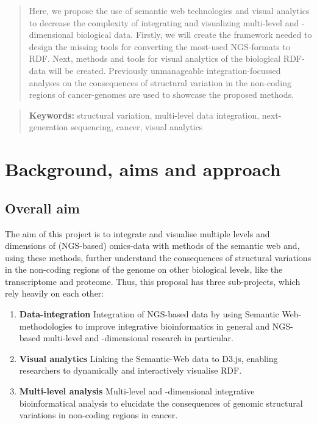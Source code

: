 \documentclass[twoside,fontsize=10pt]{article}
\renewcommand{\abstractname}{}    %
\begin{document}
\begin{abstract}
\noindent Here, we propose the use of semantic web technologies and visual analytics to decrease the complexity of integrating and visualizing multi-level and -dimensional biological data. Firstly, we will create the framework needed to design the missing tools for converting the most-used NGS-formats to RDF. Next, methods and tools for visual analytics of the biological RDF-data will be created. Previously unmanageable integration-focussed analyses on the consequences of structural variation in the non-coding regions of cancer-genomes are used to showcase the proposed methods.
\end{abstract}
\medskip
\renewcommand{\abstractname}{\begin{center}
Layman's summary
\end{center}}    %
\begin{abstract}\noindent 
\lipsum[1]
\medskip
\noindent \textbf{Keywords:} structural variation, multi-level data integration, next-generation sequencing, cancer, visual analytics
\end{abstract}



\newpage
\section*{Background, aims and approach}
\subsection*{Overall aim}
The aim of this project is to integrate and visualise multiple levels and dimensions of (NGS-based) omics-data with methods of the semantic web and, using these methods, further understand the consequences of structural variations in the non-coding regions of the genome on other biological levels, like the transcriptome and proteome. Thus, this proposal has three sub-projects, which rely heavily on each other:

\begin{enumerate}
\item \textbf{Data-integration} 
Integration of NGS-based data by using Semantic Web-methodologies to improve integrative bioinformatics in general and NGS-based multi-level and -dimensional research in particular.
\item \textbf{Visual analytics} 
Linking the Semantic-Web data to D3.js, enabling researchers to dynamically and interactively visualise RDF.
\item \textbf{Multi-level analysis} 
Multi-level and -dimensional integrative bioinformatical analysis to elucidate the consequences of genomic structural variations in non-coding regions in cancer.
\end{enumerate}
\end{document}
